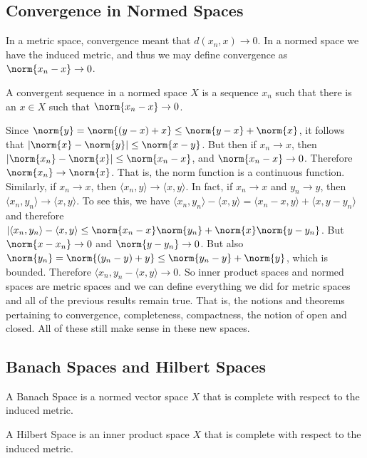     \subsection{Convergence in Normed Spaces}
        In a metric space, convergence meant that
        $d(x_{n},x)\rightarrow{0}$. In a normed space
        we have the induced metric, and thus we may define
        convergence as $\norm{x_{n}-x}\rightarrow{0}$.
        \begin{definition}
            A convergent sequence in a normed space $X$
            is a sequence $x_{n}$ such that there is an
            $x\in{X}$ such that
            $\norm{x_{n}-x}\rightarrow{0}$.
        \end{definition}
        Since
        $\norm{y}=\norm{(y-x)+x}\leq\norm{y-x}+\norm{x}$,
        it follows that
        $|\norm{x}-\norm{y}|\leq\norm{x-y}$.
        But then if $x_{n}\rightarrow{x}$, then
        $|\norm{x_{n}}-\norm{x}|\leq\norm{x_{n}-x}$,
        and $\norm{x_{n}-x}\rightarrow{0}$. Therefore
        $\norm{x_{n}}\rightarrow\norm{x}$. That is,
        the norm function is a continuous function.
        Similarly, if $x_{n}\rightarrow{x}$, then
        $\langle{x_{n},y}\rangle\rightarrow%
         \langle{x,y}\rangle$.
        In fact, if $x_{n}\rightarrow{x}$ and
        $y_{n}\rightarrow{y}$, then
        $\langle{x_{n},y_{n}}\rangle%
         \rightarrow\langle{x,y}\rangle$. To see this, we
        have
        $\langle{x_{n},y_{n}}\rangle-\langle{x,y}\rangle%
         =\langle{x_{n}-x,y}\rangle+\langle{x,y-y_{n}}\rangle$
        and therefore
        $|\langle{x_{n},y_{n}}\rangle-\langle{x,y}\rangle%
         \leq\norm{x_{n}-x}\norm{y_{n}}%
         +\norm{x}\norm{y-y_{n}}$. But $\norm{x-x_{n}}\rightarrow{0}$
        and $\norm{y-y_{n}}\rightarrow{0}$. But also
        $\norm{y_{n}}=\norm{(y_{n}-y)+y}\leq\norm{y_{n}-y}+\norm{y}$,
        which is bounded. Therefore
        $\langle{x_{n},y_{n}}-\langle{x,y}\rangle\rightarrow{0}$.
        So inner product spaces and normed spaces are metric spaces
        and we can define everything we did for metric spaces and all
        of the previous results remain true. That is, the notions and
        theorems pertaining to convergence, completeness, compactness,
        the notion of open and closed. All of these still make sense in
        these new spaces.
    \subsection{Banach Spaces and Hilbert Spaces}
        \begin{definition}
            A Banach Space is a normed vector space $X$ that is
            complete with respect to the induced metric.
        \end{definition}
        \begin{definition}
            A Hilbert Space is an inner product space $X$ that is
            complete with respect to the induced metric.
        \end{definition}
